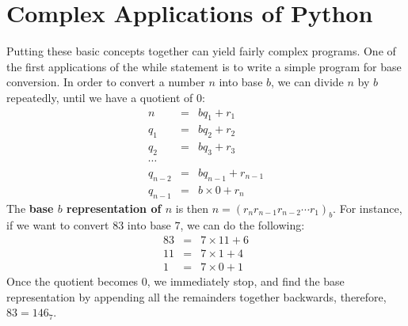 \documentclass[12pt,openany]{book} %
\theoremstyle{definition}
\begin{document}
\section{Complex Applications of Python}  

Putting these basic concepts together can yield fairly complex programs.  One of the first applications of the while statement is to write a simple program for base conversion.  In order to convert a number $n$ into base $b$, we can divide $n$ by $b$ repeatedly, until we have a quotient of $0$:  \begin{eqnarray*}  n&=&bq_1+r_1 \\ q_1&=&bq_2+r_2 \\ q_2&=&bq_3+r_3 \\ \cdots \\ q_{n-2}&=&bq_{n-1}+r_{n-1} \\ q_{n-1} &=& b\times \boxed{0}+r_n\end{eqnarray*}
The \textbf{base $b$ representation of $n$} is then $n=\left(r_n r_{n-1} r_{n-2}\cdots r_1 \right)_{b}$.  
For instance, if we want to convert $83$ into base $7$, we can do the following:
\begin{eqnarray*}  83&=&7\times 11+6 \\ 11&=&7\times 1+4 \\ 1&=&7\times \boxed{0}+1 \end{eqnarray*}
Once the quotient becomes $0$, we immediately stop, and find the base representation by appending all the remainders together backwards, therefore, $83=146_7$.  
\end{document}
